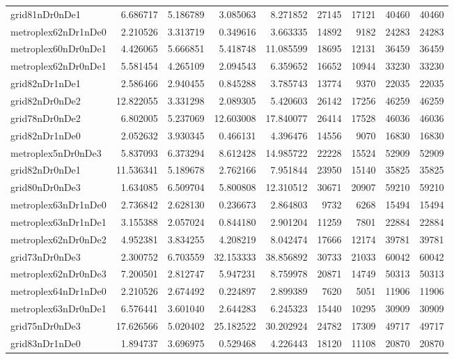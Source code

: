 \begin{longtable}{|l|r|r|r|r|r|r|r|r|}
grid81nDr0nDe1 & 6.686717 & 5.186789 & 3.085063 & 8.271852 & 27145 & 17121 & 40460 & 40460 \\
metroplex62nDr1nDe0 & 2.210526 & 3.313719 & 0.349616 & 3.663335 & 14892 & 9182 & 24283 & 24283 \\
metroplex60nDr0nDe1 & 4.426065 & 5.666851 & 5.418748 & 11.085599 & 18695 & 12131 & 36459 & 36459 \\
metroplex62nDr0nDe1 & 5.581454 & 4.265109 & 2.094543 & 6.359652 & 16652 & 10944 & 33230 & 33230 \\
grid82nDr1nDe1 & 2.586466 & 2.940455 & 0.845288 & 3.785743 & 13774 & 9370 & 22035 & 22035 \\
grid82nDr0nDe2 & 12.822055 & 3.331298 & 2.089305 & 5.420603 & 26142 & 17256 & 46259 & 46259 \\
grid78nDr0nDe2 & 6.802005 & 5.237069 & 12.603008 & 17.840077 & 26414 & 17528 & 46036 & 46036 \\
grid82nDr1nDe0 & 2.052632 & 3.930345 & 0.466131 & 4.396476 & 14556 & 9070 & 16830 & 16830 \\
metroplex5nDr0nDe3 & 5.837093 & 6.373294 & 8.612428 & 14.985722 & 22228 & 15524 & 52909 & 52909 \\
grid82nDr0nDe1 & 11.536341 & 5.189678 & 2.762166 & 7.951844 & 23950 & 15140 & 35825 & 35825 \\
grid80nDr0nDe3 & 1.634085 & 6.509704 & 5.800808 & 12.310512 & 30671 & 20907 & 59210 & 59210 \\
metroplex63nDr1nDe0 & 2.736842 & 2.628130 & 0.236673 & 2.864803 & 9732 & 6268 & 15494 & 15494 \\
metroplex63nDr1nDe1 & 3.155388 & 2.057024 & 0.844180 & 2.901204 & 11259 & 7801 & 22884 & 22884 \\
metroplex62nDr0nDe2 & 4.952381 & 3.834255 & 4.208219 & 8.042474 & 17666 & 12174 & 39781 & 39781 \\
grid73nDr0nDe3 & 2.300752 & 6.703559 & 32.153333 & 38.856892 & 30733 & 21033 & 60042 & 60042 \\
metroplex62nDr0nDe3 & 7.200501 & 2.812747 & 5.947231 & 8.759978 & 20871 & 14749 & 50313 & 50313 \\
metroplex64nDr1nDe0 & 2.210526 & 2.674492 & 0.224897 & 2.899389 & 7620 & 5051 & 11906 & 11906 \\
metroplex63nDr0nDe1 & 6.576441 & 3.601040 & 2.644283 & 6.245323 & 15440 & 10295 & 30909 & 30909 \\
grid75nDr0nDe3 & 17.626566 & 5.020402 & 25.182522 & 30.202924 & 24782 & 17309 & 49717 & 49717 \\
grid83nDr1nDe0 & 1.894737 & 3.696975 & 0.529468 & 4.226443 & 18120 & 11108 & 20870 & 20870 \\

\end{longtable}
